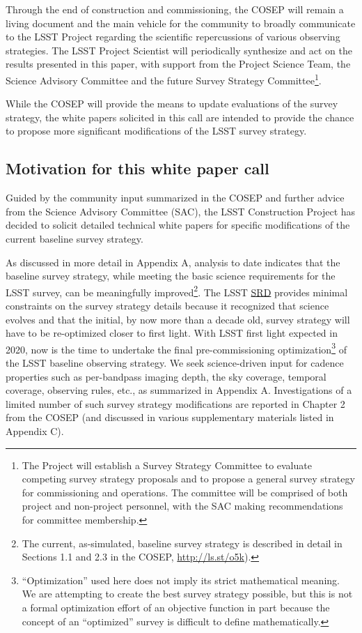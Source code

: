 \documentclass[DM,lsstdraft,toc,usenatbib]{lsstdoc}
\begin{document}
Through the end of construction and commissioning, the COSEP will 
remain a living document and the main vehicle for the community to broadly 
communicate to the LSST Project regarding the scientific repercussions of various observing strategies. The LSST Project Scientist will 
periodically synthesize and act on the results presented in this paper, with support from the 
Project Science Team, the Science Advisory Committee and the future Survey Strategy 
Committee\footnote{The Project will establish a Survey 
Strategy Committee to evaluate competing survey strategy proposals and to propose a general survey 
strategy for commissioning and operations. The committee will be comprised of both project and 
non-project personnel, with the SAC making recommendations for committee membership.}.

While the COSEP will provide the means to update evaluations of the survey strategy, the white papers solicited in this call are 
intended to provide the chance to propose more significant modifications of the LSST survey strategy. 

\subsection{Motivation for this white paper call}

Guided by the community input summarized in the COSEP and further 
advice from the Science Advisory Committee (SAC), the LSST Construction Project has decided to
solicit detailed technical white papers for specific modifications of the current baseline survey strategy.

As discussed in more detail in Appendix A, analysis to date indicates that the baseline 
survey strategy, while meeting the basic science requirements for the LSST survey, can be meaningfully 
improved\footnote{The current, as-simulated, baseline survey strategy is described in detail in Sections 1.1 
and 2.3 in the COSEP, \href{http://ls.st/o5k}{http://ls.st/o5k}).}.
The LSST \href{http://ls.st/srd}{SRD}
provides minimal constraints on the survey strategy details because it recognized that science evolves and that the 
initial, by now more than a decade old, survey strategy will have to be re-optimized closer to first 
light. With LSST first light expected in 2020, now is the time to undertake the final pre-commissioning
optimization\footnote{``Optimization'' used here does not imply its strict mathematical meaning. 
We are attempting to create the best survey strategy possible, but this is not a formal optimization 
effort of an objective function in part because the concept of an ``optimized'' survey is difficult to 
define mathematically.} 
of the LSST baseline observing strategy. We seek science-driven input for cadence 
properties such as per-bandpass imaging depth, the sky coverage, temporal coverage, observing
rules, etc., as summarized in Appendix A. Investigations of a limited number of such survey strategy 
modifications are reported in Chapter 2 from the COSEP (and discussed 
in various supplementary materials listed in Appendix C). 
\end{document}
